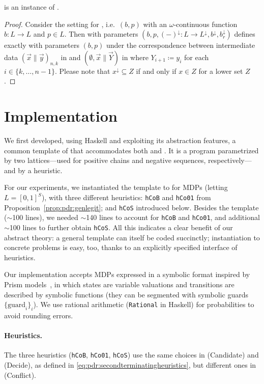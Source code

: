 \begin{prop}\label{prop:pdr:instanceAI2}
	\ADPDR{} is an instance of \APDRAI{}.
\end{prop}
\begin{proof}
	Consider the setting for \ADPDR{}, i.e.~$(b, p)$ with an $\omega$-continuous function $b\colon L \to L$ and $p \in L$.
	Then \APDRAI{} with parameters $(b,p, (-)^\downarrow \colon L \to L^\downarrow,b^\downarrow, b^\downarrow_r)$ defines exactly \ADPDR{} with parameters $(b, p)$ under the correspondence between intermediate data $(\vec{x} \| \vec{y})_{n, k}$ in \APDRAI{} and $(\emptyset, \vec{x} \| \vec{Y})$ in \ADPDR{} where $Y_{i+1} \coloneqq y_{i}$ for each $i \in \{k, \dots, n-1\}$. Please note that $x^\downarrow \subseteq Z$ if and only if $x \in Z$ for a lower set $Z$.
\end{proof}

\section{Implementation}\label{sec:pdr:experiments}
We first developed, using Haskell and exploiting its abstraction features, a common template of {\APDRAI} that accommodates both {\APDR} and {\ADPDR}.
It is a  program parametrized by two lattices---used for positive chains and negative sequences, respectively---and by a heuristic.

For our experiments, we instantiated the template to \ADPDR{} for MDPs (letting $L=[0,1]^{S}$), with three different heuristics: \verb|hCoB| and \verb|hCo01| from Proposition~\ref{prop:pdr:genlegit}; and \verb|hCoS| introduced below. Besides the template ($\sim$100 lines),  we needed $\sim$140 lines to account for \verb|hCoB| and \verb|hCo01|, and additional $\sim$100 lines to further obtain \verb|hCoS|. All this indicates a clear benefit of our abstract theory: a general template can itself be coded succinctly; instantiation to concrete problems is easy, too, thanks to an explicitly specified interface of heuristics.

Our implementation accepts MDPs  expressed in a symbolic format inspired by Prism models~\cite{KNP11}, in which states are variable valuations and  transitions are described by symbolic functions (they can be segmented with symbolic guards $\{\text{guard}_i\}_{i}$). We use rational arithmetic (\verb|Rational| in Haskell) for probabilities to avoid rounding errors.

\paragraph{Heuristics.}
The three heuristics (\verb|hCoB|, \verb|hCo01|, \verb|hCoS|) use the same choices in (Candidate) and (Decide), as defined in \eqref{eq:pdr:secondterminatingheuristics}, but different ones in (Conflict).

